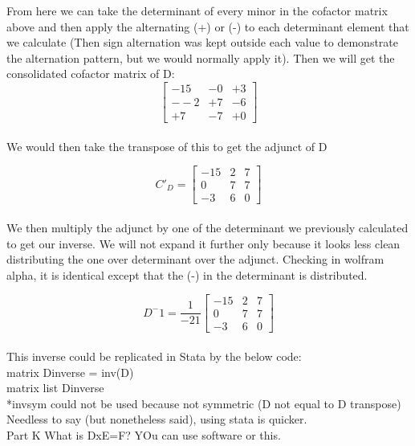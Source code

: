 \documentclass[11pt]{article}
\begin{document}
From here we can take the determinant of every minor in the cofactor matrix above and then apply the alternating (+) or (-) to each determinant element that we calculate (Then sign alternation was kept outside each value to demonstrate the alternation pattern, but we would normally apply it). Then we will get the consolidated cofactor matrix of D:\\


\[
\left[
\begin{array}{ccc}
-15&-0&+3\\
--2&+7&-6\\
+7&-7&+0
\end{array} 
\right]
 \]\\

We would then take the transpose of this to get the adjunct of D

\[C'_D=
\left[
\begin{array}{ccc}
-15&2&7\\
0&7&7\\
-3&6&0
\end{array} 
\right]
 \]\\

We then multiply the adjunct by one of the determinant we previously calculated to get our inverse. We will not expand it further only because it looks less clean distributing the one over determinant over the adjunct. Checking in wolfram alpha, it is identical except that the (-) in the determinant is distributed.

\[D^-1=\frac{1}{-21}
\left[
\begin{array}{ccc}
-15&2&7\\
0&7&7\\
-3&6&0
\end{array} 
\right]
 \]\\

This inverse could be replicated in Stata by the below code:\\

matrix Dinverse = inv(D)\\
matrix list Dinverse\\
*invsym could not be used because not symmetric (D not equal to D transpose)\\

Needless to say (but nonetheless said), using stata is quicker.\\

Part K What is DxE=F? YOu can use software or this.\\
\end{document}
